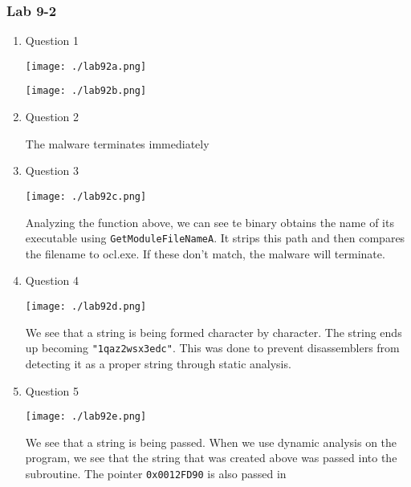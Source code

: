 \documentclass[11pt]{article}
\begin{document}
\subsubsection{Lab 9-2}
\label{sec:org3d783f7}
\begin{enumerate}
\item Question 1
\label{sec:org6b315d5}

\begin{center}
\texttt{[image: ./lab92a.png]}
\end{center}
\begin{center}
\texttt{[image: ./lab92b.png]}
\end{center}

\item Question 2
\label{sec:orgf30365c}

The malware terminates immediately

\item Question 3
\label{sec:org7a877cd}

\begin{center}
\texttt{[image: ./lab92c.png]}
\end{center}
Analyzing the function above, we can see te binary obtains the name of its executable using \texttt{GetModuleFileNameA}. It strips this path and then compares the filename to ocl.exe. If these don't match, the malware will terminate.

\item Question 4
\label{sec:org2c2d09d}

\begin{center}
\texttt{[image: ./lab92d.png]}
\end{center}
We see that a string is being formed character by character. The string ends up becoming \texttt{"1qaz2wsx3edc"}. This was done to prevent disassemblers from detecting it as a proper string through static analysis.

\item Question 5
\label{sec:orgbc2a04c}

\begin{center}
\texttt{[image: ./lab92e.png]}
\end{center}

We see that a string is being passed. When we use dynamic analysis on the program, we see that the string that was created above was passed into the subroutine. The pointer \texttt{0x0012FD90} is also passed in


\end{enumerate}
\end{document}
